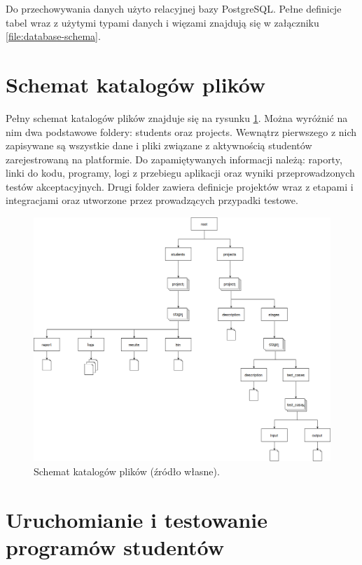 Do przechowywania danych użyto relacyjnej bazy PostgreSQL.
Pełne definicje tabel wraz z użytymi typami danych i więzami znajdują się w załączniku \ref{file:database-schema}.


\section{Schemat katalogów plików}
\label{directories}

Pełny schemat katalogów plików znajduje się na rysunku \ref{fig:platform-directories}.
Można wyróżnić na nim dwa podstawowe foldery: students oraz projects.
Wewnątrz pierwszego z nich zapisywane są wszystkie dane i pliki związane z aktywnością studentów zarejestrowaną na platformie.
Do zapamiętywanych informacji należą: raporty, linki do kodu, programy, logi z przebiegu aplikacji oraz wyniki przeprowadzonych testów akceptacyjnych.
Drugi folder zawiera definicje projektów wraz z etapami i integracjami oraz utworzone przez prowadzących przypadki testowe.

\begin{figure}[h]
    \centering
    \includegraphics[width = 13cm]{chapter02/directories.png}
    \caption{Schemat katalogów plików (źródło własne).}
    \label{fig:platform-directories}
\end{figure}

\vfill

\section{Uruchomianie i testowanie programów studentów}
\label{run-and-test}

